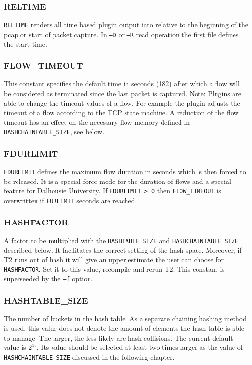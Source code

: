 \subsubsection{RELTIME}
{\tt RELTIME} renders all time based plugin output into relative to the beginning of the pcap or start of packet capture. In {\tt --D} or {\tt --R} read operation the first file defines the start time.

\subsubsection{FLOW\_TIMEOUT}
This constant specifies the default time in seconds (182) after which a flow will be considered as terminated since the last packet is captured. Note: Plugins are able to change the timeout values of a flow. For example the  plugin adjusts the timeout of a flow according to the TCP state machine. A reduction of the flow timeout has an effect on the necessary flow memory defined in {\tt HASHCHAINTABLE\_SIZE}, see below.

\subsubsection{FDURLIMIT}
{\tt FDURLIMIT} defines the maximum flow duration in seconds which is then forced to be released.
It is a special force mode for the duration of flows and a special feature for Dalhousie University.
If {\tt FDURLIMIT > 0} then {\tt FLOW\_TIMEOUT} is overwritten if {\tt FURLIMIT} seconds are reached.

\subsubsection{HASHFACTOR}
A factor to be multiplied with the {\tt HASHTABLE\_SIZE} and {\tt HASHCHAINTABLE\_SIZE} described below.
It facilitates the correct setting of the hash space.
Moreover, if T2 runs out of hash it will give an upper estimate the user can choose for {\tt HASHFACTOR}.
Set it to this value, recompile and rerun T2.
This constant is superseeded by the \hyperref[s:foption]{{\tt --f} option}.

\subsubsection{HASHTABLE\_SIZE}
The number of buckets in the hash table.
As a separate chaining hashing method is used, this value does not denote the amount of elements the hash table is able to manage!
The larger, the less likely are hash collisions.
The current default value is $2^{18}$.
Its value should be selected at least two times larger as the value of {\tt HASHCHAINTABLE\_SIZE} discussed in the following chapter.

